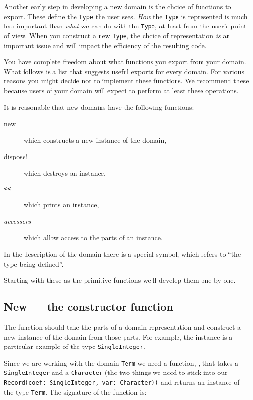 Another early step in developing a new domain is the choice of functions
to export. These define the \verb"Type" the user sees. {\em How} the \verb"Type" is represented
is much less important than {\em what} we can do with the \verb"Type", at least from
the user's point of view. When you construct a new \verb"Type", the choice of
representation {\em is} an important issue and will impact the efficiency of
the resulting code.

You have complete
freedom about what functions you export from your domain. What follows is
a list that suggests useful exports for every domain. For various reasons
you might decide not to implement these functions. We recommend these
because users of your domain will expect to perform at least these
operations.

It is reasonable that new domains have the following functions:

\begin{description}
\item[new]       which constructs a new instance of the domain,
\item[dispose!]   which destroys an instance,
\item[{\tt <<}]        which prints an instance,
\item[{\em accessors}] which allow access to the parts of an instance.
\end{description}
In the description of the domain there is a special symbol, \ttin{\%} 
which refers to ``the type being defined''. 

Starting with these as the primitive functions we'll develop them one by one.

\subsection{New --- the constructor function}

The function  should take the parts of a domain
representation and construct a new instance of the domain from those
parts.  For example, the instance  is a particular example of the
type \verb"SingleInteger".

Since we are working with the domain \verb"Term" we need a function, ,
that takes a \verb"SingleInteger" and a \verb"Character" (the two things we need
to stick into our \verb"Record(coef: SingleInteger, var: Character))" and returns
an instance of the type \verb"Term". The signature of the  function is:

